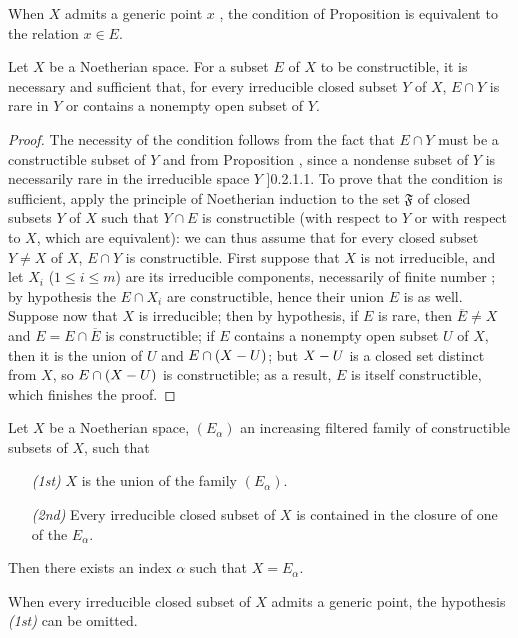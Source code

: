 When $X$ admits a generic point $x$ , the condition of Proposition  is equivalent to the relation $x\in E$.

\begin{proposition}[9.2.3]
\label{0.9.2.3}
Let $X$ be a Noetherian space.
For a subset $E$ of $X$ to be constructible, it is necessary and sufficient that, for every irreducible closed subset $Y$ of $X$, $E\cap Y$ is rare in $Y$ or contains a nonempty open subset of $Y$.
\end{proposition}

\begin{proof}
The necessity of the condition follows from the fact that $E\cap Y$ must be a constructible subset of $Y$ and from Proposition , since a nondense subset of $Y$ is necessarily rare in the irreducible space $Y$ \sref[0]]{0.2.1.1}.
To prove that the condition is sufficient, apply the principle of Noetherian induction  to the set $\mathfrak{F}$ of closed subsets $Y$ of $X$ such that $Y\cap E$ is constructible (with respect to $Y$ or with respect to $X$, which are equivalent): we can thus assume that for every closed subset $Y\neq X$ of $X$, $E\cap Y$ is constructible.
First suppose that $X$ is not irreducible, and let $X_i$ ($1\leq i\leq m$) are its irreducible components, necessarily of finite number ; by hypothesis the $E\cap X_i$ are constructible, hence their union $E$ is as well.
Suppose now that $X$ is irreducible; then by hypothesis, if $E$ is rare, then $\overline{E}\neq X$ and $E=E\cap\overline{E}$ is constructible; if $E$ contains a nonempty open subset $U$ of $X$, then it is the union of $U$ and $E\cap(X- U)$; but $X- U$ is a closed set distinct from $X$, so $E\cap(X- U)$ is constructible; as a result, $E$ is itself constructible, which finishes the proof.
\end{proof}

\begin{corollary}[9.2.4]
\label{0.9.2.4}
Let $X$ be a Noetherian space, $(E_\alpha)$ an increasing filtered family of constructible subsets of $X$, such that
\begin{enumerate}
  \item[\emph{(1st)}] $X$ is the union of the family $(E_\alpha)$.
  \item[\emph{(2nd)}] Every irreducible closed subset of $X$ is contained in the closure of one of the $E_\alpha$.
\end{enumerate}

Then there exists an index $\alpha$ such that $X=E_\alpha$.

When every irreducible closed subset of $X$ admits a generic point, the hypothesis \emph{(1st)} can be omitted.
\end{corollary}

